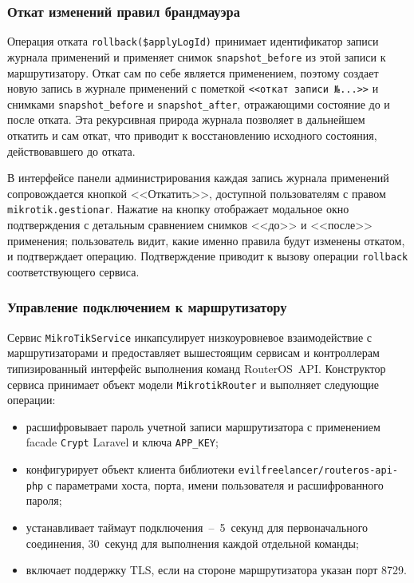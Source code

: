 \subsubsection{Откат изменений правил брандмауэра}

Операция отката \texttt{rollback(\$applyLogId)} принимает идентификатор записи журнала применений и применяет снимок \texttt{snapshot\_before} из этой записи к маршрутизатору. Откат сам по себе является применением, поэтому создает новую запись в журнале применений с пометкой \texttt{<<откат записи №...>>} и снимками \texttt{snapshot\_before} и \texttt{snapshot\_after}, отражающими состояние до и после отката. Эта рекурсивная природа журнала позволяет в дальнейшем откатить и сам откат, что приводит к восстановлению исходного состояния, действовавшего до отката.

В интерфейсе панели администрирования каждая запись журнала применений сопровождается кнопкой <<Откатить>>, доступной пользователям с правом \texttt{mikrotik.gestionar}. Нажатие на кнопку отображает модальное окно подтверждения с детальным сравнением снимков <<до>> и <<после>> применения; пользователь видит, какие именно правила будут изменены откатом, и подтверждает операцию. Подтверждение приводит к вызову операции \texttt{rollback} соответствующего сервиса.

\subsubsection{Управление подключением к маршрутизатору}

Сервис \texttt{MikroTikService} инкапсулирует низкоуровневое взаимодействие с маршрутизаторами и предоставляет вышестоящим сервисам и контроллерам типизированный интерфейс выполнения команд RouterOS~API. Конструктор сервиса принимает объект модели \texttt{MikrotikRouter} и выполняет следующие операции:
\begin{itemize}
\item расшифровывает пароль учетной записи маршрутизатора с применением facade \texttt{Crypt} Laravel и ключа \texttt{APP\_KEY};
\item конфигурирует объект клиента библиотеки \texttt{evilfreelancer/routeros-api-php} с параметрами хоста, порта, имени пользователя и расшифрованного пароля;
\item устанавливает таймаут подключения~--~5~секунд для первоначального соединения, 30~секунд для выполнения каждой отдельной команды;
\item включает поддержку TLS, если на стороне маршрутизатора указан порт 8729.
\end{itemize}

